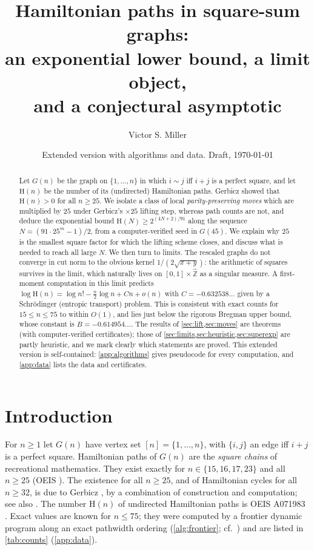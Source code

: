 \documentclass[11pt]{amsart}
\title[Hamiltonian paths in square-sum graphs]{Hamiltonian paths in square-sum graphs:\\
an exponential lower bound, a limit object,\\ and a conjectural asymptotic}
\author{Victor S. Miller}
\date{Extended version with algorithms and data. Draft, \today}
\theoremstyle{definition}
\newcommand{\Ham}{\mathrm{H}}
\newcommand{\Zhat}{\widehat{\mathbb{Z}}}
\begin{document}
\begin{abstract}
Let $G(n)$ be the graph on $\{1,\dots,n\}$ in which $i\sim j$ iff $i+j$ is a perfect
square, and let $\Ham(n)$ be the number of its (undirected) Hamiltonian paths.
Gerbicz showed that $\Ham(n)>0$ for all $n\ge 25$. We isolate a class of local
\emph{parity-preserving moves} which are multiplied by $25$ under Gerbicz's
$\times 25$ lifting step, whereas path counts are not, and deduce the exponential bound
$\Ham(N)\ge 2^{(4N+2)/91}$ along the sequence $N=(91\cdot 25^m-1)/2$,
from a computer-verified seed in $G(45)$. We explain why $25$ is the smallest
square factor for which the lifting scheme closes, and discuss what is needed to
reach all large $N$. We then turn to limits. The rescaled graphs do not converge in cut
norm to the obvious kernel $1/(2\sqrt{x+y})$: the arithmetic of squares
survives in the limit, which naturally lives on $[0,1]\times\Zhat$ as a singular
measure. A first-moment computation in this limit predicts
$\log \Ham(n) = \log n! - \tfrac n2\log n + Cn + o(n)$ with
$C=-0.632538\ldots$ given by a Schr\"odinger (entropic transport) problem. This is
consistent with exact counts for $15\le n\le 75$ to within $O(1)$, and lies
just below the rigorous Bregman upper bound, whose constant is $B=-0.614954\ldots$.
The results of \cref{sec:lift,sec:moves} are theorems
(with computer-verified certificates); those of \cref{sec:limits,sec:heuristic,sec:superexp}
are partly heuristic, and we mark clearly which statements are proved. This extended version
is self-contained: \cref{app:algorithms} gives pseudocode for every computation, and \cref{app:data}
lists the data and certificates.
\end{abstract}

\maketitle

\section{Introduction}

For $n\ge1$ let $G(n)$ have vertex set $[n]=\{1,\dots,n\}$, with $\{i,j\}$ an edge iff
$i+j$ is a perfect square. Hamiltonian paths of $G(n)$ are the \emph{square chains}
of recreational mathematics. They exist exactly for $n\in\{15,16,17,23\}$ and all $n\ge25$
(OEIS \cite{OEIS-A090461}). The existence for all $n\ge 25$, and of Hamiltonian cycles
for all $n\ge32$, is due to Gerbicz \cite{Gerbicz}, by a combination of
construction and computation; see also \cite[Appendix]{BerlekampGuy}.
The number $\Ham(n)$ of undirected Hamiltonian paths is OEIS A071983
\cite{OEIS-A071983}. Exact values are known for $n\le 75$; they were computed by a frontier dynamic program along an exact pathwidth ordering
(\cref{alg:frontier}; cf.\ \cite{Pettersson}) and are listed in \cref{tab:counts} (\cref{app:data}).
\end{document}
